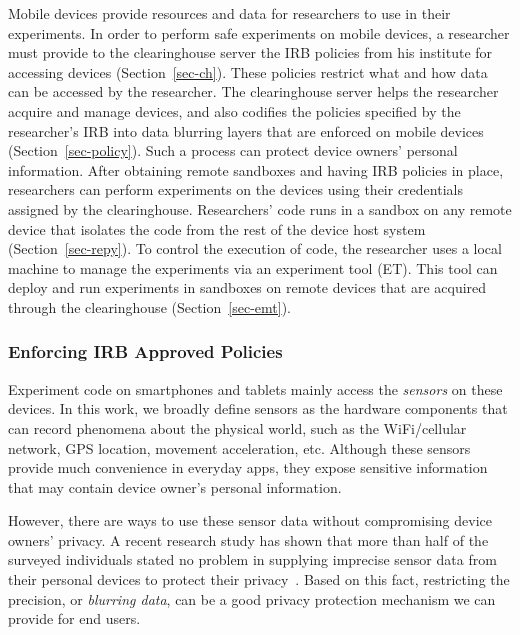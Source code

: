 Mobile devices
provide resources and data for researchers to use in their
experiments. In order to perform safe experiments on mobile
devices, a researcher must provide to the clearinghouse server
the IRB policies from his institute for accessing devices 
(Section~\ref{sec-ch}).  These 
policies restrict what and how data can be accessed by the 
researcher. The
clearinghouse server helps the researcher acquire and manage
devices, and also codifies the policies specified by the
researcher's IRB into data blurring layers that are enforced on
mobile devices (Section~\ref{sec-policy}). Such a process can protect device
owners' personal information. After obtaining remote sandboxes
and having IRB policies in place, researchers can perform
experiments on the devices using their credentials assigned by
the clearinghouse. Researchers' code runs in a sandbox on any
remote device that isolates the code from the rest of the device
host system (Section~\ref{sec-repy}). To control the execution of 
code, the researcher uses a local machine to manage the 
experiments via an experiment tool (ET). This tool can deploy 
and run experiments in sandboxes on remote devices that are 
acquired through the clearinghouse (Section~\ref{sec-emt}).

\subsubsection{Enforcing IRB Approved Policies}
Experiment code on smartphones and tablets mainly access
the \textit{sensors} on these devices. In this work, we broadly 
define sensors as the hardware components that can record 
phenomena about the physical world, such as the WiFi/cellular 
network, GPS location, movement acceleration, etc. Although
these sensors provide much convenience in everyday apps, 
they expose sensitive information that may contain device 
owner's personal information.

However, there are ways to use these sensor data without 
compromising device owners' privacy.
A recent research study has shown that more than half of the 
surveyed individuals stated no problem in supplying imprecise 
sensor data from their personal devices to protect their 
privacy~\cite{fawaz2014location}. Based on this fact, restricting 
the precision, or \textit{blurring 
data}, can be a good privacy protection mechanism we can 
provide for end users. 

